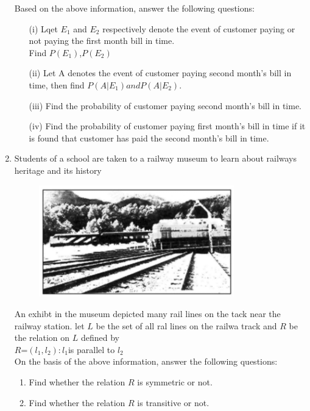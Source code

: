 \documentclass{article}
\begin{document}
\begin{enumerate}
Based on the above information, answer the following questions:		
\begin{enumerate}
	\item[(i)] Lqet $E_{1}$ and $E_{2}$ respectively denote the event of customer paying or not paying the first month bill in time.\\ Find $P(E_{1})$,$P(E_{2})$
	\item[(ii)] Let A denotes the event of customer paying second month's bill in time, then find $P( A|E_{1} ) and P( A |E_{2})$.
	\item[(iii)] Find the probability of customer paying second month's bill in time.
	\item[(iv)] Find the probability of customer paying first month's bill in time if it is found that customer has paid the second month's bill in time.
\end{enumerate}
\item Students of a school are taken to a railway museum to learn about railways heritage and its history\\
	\begin{figure}[h!]
		\centering
		\includegraphics[width=0.8\textwidth]{images/fig1.jpg}
		\label{fig:image1}
	\end{figure}
	An exhibt in the museum depicted many rail lines on the tack near the railway station. let $L$ be the set of all ral lines on the railwa track and $R$ be the relation on $L$ defined by\\
		$R$={$(l_{1},l_{2}):l_{1} $is parallel to $l_{2}$}\\
	On the basis of the above information, answer the following questions:
\begin{enumerate}
\item Find whether the relation $R$ is symmetric or not.

\item Find whether the relation $R$ is transitive or not.


\end{enumerate}
\end{enumerate}
\end{document}
